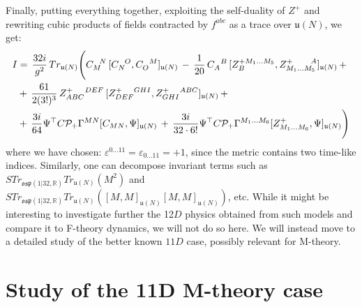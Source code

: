 \documentclass[a4paper,11pt]{article}
\begin{document}
Finally, putting everything together, exploiting the self-duality of $Z^+$ 
and rewriting cubic products of fields contracted by $f^{abc}$ as a trace over 
$\mathfrak{u}(N)$, we get:
\begin{align}
I &=\, \frac{32i}{g^2}\,Tr_{\mathfrak{u}(N)}
\Bigg(
C_M^{\phantom{A}N}\, [C_N^{\phantom{A}O},C_O^{\phantom{A}M}]_{\mathfrak{u}(N)}\,-\,
\frac{1}{20}\, C_A^{\phantom{A}B}\, [Z^{+M_1\dots M_5}_{B}, 
Z_{M_1\dots M_5}^{+\phantom{\dots M_5}A}]_{\mathfrak{u}(N)}
\,+\notag\\
&+\,\frac{61}{2(3!)^3}\,Z^{+\phantom{BC}DEF}_{ABC}\,[Z^{+\phantom{EF}GHI}_{DEF}
,Z^{+\phantom{HI}ABC}_{GHI}]_{\mathfrak{u}(N)}\,+\notag \\
&+\,\frac{3i}{64}\Psi^{\top} C {\cal P}_+ \Gamma^{MN} [C_{MN}, \Psi]_{\mathfrak{u}(N)} \,+\,
\frac{3i}{32 \cdot 6!}\Psi^{\top} C {\cal P}_+ \Gamma^{M_1 \ldots M_6}[ Z^{+}_{M_1 \ldots M_6}, 
\Psi]_{\mathfrak{u}(N)}
\Bigg)\notag
\end{align}
where we have chosen: $\varepsilon^{0 \dots 11} = \varepsilon_{0 \dots 11} =+1$, since the metric contains
two time-like indices. Similarly, one can decompose invariant terms such as 
$STr_{\mathfrak{osp}(1|32,\mathbb{R})} Tr_{\mathfrak{u}(N)} (M^2)$ and \linebreak
$STr_{\mathfrak{osp}(1|32,\mathbb{R})} Tr_{\mathfrak{u}(N)} ([M,M]_{\mathfrak{u}(N)}[M,M]_{\mathfrak{u}(N)})$,
etc. While it might be interesting to investigate further the 12$D$ physics obtained
from such models and compare it to F-theory dynamics, we will not do so here. 
We will instead move to a detailed study of the better known $11D$ case, 
possibly relevant for M-theory.

\section{Study of the 11D M-theory case}
\end{document}
